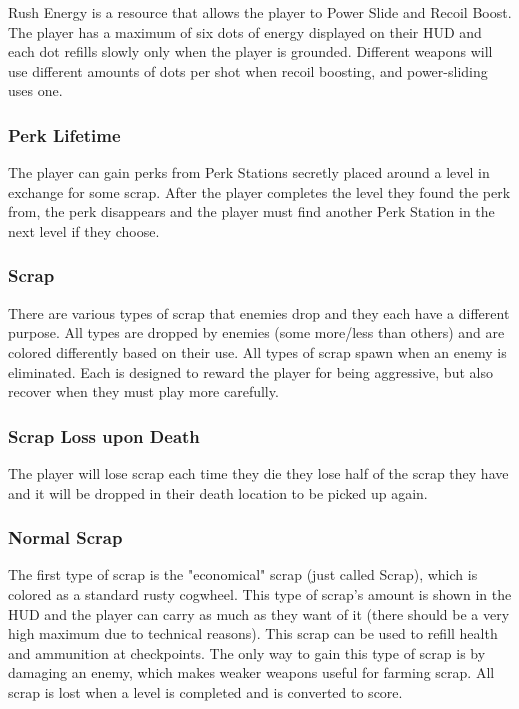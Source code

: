 \documentclass[12pt]{article}
\begin{document}
Rush Energy is a resource that allows the player to Power Slide and Recoil Boost. The player has a maximum of six dots of energy displayed on their HUD and each dot refills slowly only when the player is grounded. Different weapons will use different amounts of dots per shot when recoil boosting, and power-sliding uses one.

\subsubsection{Perk Lifetime}

The player can gain perks from Perk Stations secretly placed around a level in exchange for some scrap. After the player completes the level they found the perk from, the perk disappears and the player must find another Perk Station in the next level if they choose. 

\subsubsection{Scrap}

There are various types of scrap that enemies drop and they each have a different purpose. All types are dropped by enemies (some more/less than others) and are colored differently based on their use. All types of scrap spawn when an enemy is eliminated. Each is designed to reward the player for being aggressive, but also recover when they must play more carefully. 

\subsubsection{Scrap Loss upon Death}

The player will lose scrap each time they die they lose half of the scrap they have and it will be dropped in their death location to be picked up again. 

\subsubsection{Normal Scrap}

The first type of scrap is the "economical" scrap (just called Scrap), which is colored as a standard rusty cogwheel. This type of scrap's amount is shown in the HUD and the player can carry as much as they want of it (there should be a very high maximum due to technical reasons). This scrap can be used to refill health  and ammunition at checkpoints. %
The only way to gain this type of scrap is by damaging an enemy, which makes weaker weapons useful for farming scrap. All scrap is lost when a level is completed and is converted to score. 
\end{document}
